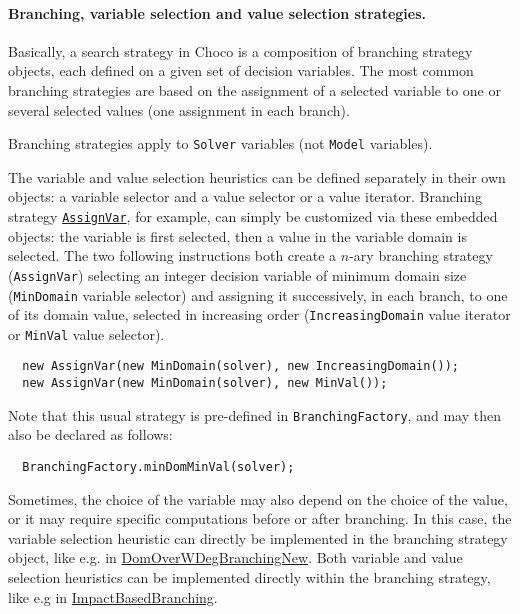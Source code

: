 \paragraph{Branching, variable selection and value selection strategies.}
Basically, a search strategy in Choco is a composition of \gls{branching strategy} objects, each defined on a given set of decision variables.
The most common branching strategies are based on the assignment of a selected variable to one or several selected values (one assignment in each branch). 
\begin{note}
Branching strategies apply to \texttt{Solver} variables (not \texttt{Model} variables).
\end{note}
The variable and value selection heuristics can be defined separately in their own objects: a \gls{variable selector} and a \gls{value selector} or a \gls{value iterator}. 
Branching strategy \hyperlink{assignvar:assignvarbranchstrat}{\tt AssignVar}, for example, can simply be customized via these embedded objects: the variable is first selected, then a value in the variable domain is selected. The two following instructions both create a $n$-ary branching strategy (\texttt{AssignVar}) selecting an integer decision variable of minimum domain size (\texttt{MinDomain} variable selector) and assigning it successively, in each branch, to one of its domain value, selected in increasing order (\texttt{IncreasingDomain} value iterator or \texttt{MinVal} value selector).
\begin{lstlisting}
  new AssignVar(new MinDomain(solver), new IncreasingDomain());
  new AssignVar(new MinDomain(solver), new MinVal());
\end{lstlisting}
Note that this usual strategy is pre-defined in \texttt{BranchingFactory}, and may then also be declared as follows:
\begin{lstlisting}
  BranchingFactory.minDomMinVal(solver);
\end{lstlisting}
Sometimes, the choice of the variable may also depend on the choice of the value, or it may require specific computations before or after branching. In this case, the variable selection heuristic can directly be implemented in the branching strategy object, like e.g. in \hyperlink{domoverwdeg:domoverwdegbranchstrat}{DomOverWDegBranchingNew}. Both variable and value selection heuristics can be implemented directly within the branching strategy, like e.g in \hyperlink{impact:impactbranchstrat}{ImpactBasedBranching}.

